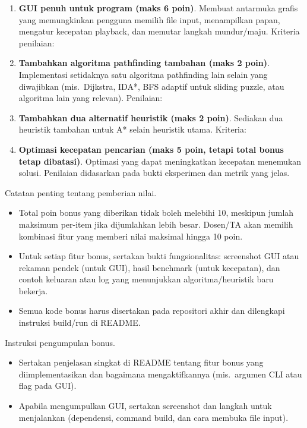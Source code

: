 \begin{enumerate}
    \item \textbf{GUI penuh untuk program (maks 6 poin)}. Membuat antarmuka grafis yang memungkinkan pengguna memilih file input, menampilkan papan, mengatur kecepatan playback, dan memutar langkah mundur/maju. Kriteria penilaian:

    \item \textbf{Tambahkan algoritma pathfinding tambahan (maks 2 poin)}. Implementasi setidaknya satu algoritma pathfinding lain selain yang diwajibkan (mis.\, Dijkstra, IDA*, BFS adaptif untuk sliding puzzle, atau algoritma lain yang relevan). Penilaian:

    \item \textbf{Tambahkan dua alternatif heuristik (maks 2 poin)}. Sediakan dua heuristik tambahan untuk A* selain heuristik utama. Kriteria:

    \item \textbf{Optimasi kecepatan pencarian (maks 5 poin, tetapi total bonus tetap dibatasi)}. Optimasi yang dapat meningkatkan kecepatan menemukan solusi. Penilaian didasarkan pada bukti eksperimen dan metrik yang jelas.
\end{enumerate}

Catatan penting tentang pemberian nilai.
\begin{itemize}
    \item Total poin bonus yang diberikan tidak boleh melebihi 10, meskipun jumlah maksimum per-item jika dijumlahkan lebih besar. Dosen/TA akan memilih kombinasi fitur yang memberi nilai maksimal hingga 10 poin.
    \item Untuk setiap fitur bonus, sertakan bukti fungsionalitas: screenshot GUI atau rekaman pendek (untuk GUI), hasil benchmark (untuk kecepatan), dan contoh keluaran atau log yang menunjukkan algoritma/heuristik baru bekerja.
    \item Semua kode bonus harus disertakan pada repositori akhir dan dilengkapi instruksi build/run di README.
\end{itemize}

Instruksi pengumpulan bonus.
\begin{itemize}
    \item Sertakan penjelasan singkat di README tentang fitur bonus yang diimplementasikan dan bagaimana mengaktifkannya (mis.\, argumen CLI atau flag pada GUI).
    \item Apabila mengumpulkan GUI, sertakan screenshot dan langkah untuk menjalankan (dependensi, command build, dan cara membuka file input).
\end{itemize}

